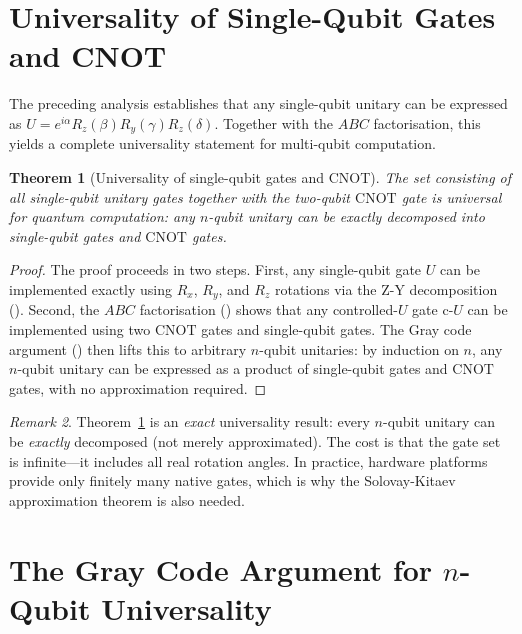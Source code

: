 \documentclass[12pt, a4paper, oneside]{report}
\theoremstyle{plain}
\newtheorem{theorem}{Theorem}[chapter]
\theoremstyle{definition}
\theoremstyle{remark}
\newtheorem{remark}[theorem]{Remark}
\newcommand{\cU}{\mathrm{c}\text{-}U}
\newcommand{\CNOT}{\mathrm{CNOT}}
\newcommand{\Rx}{R_x}
\newcommand{\Ry}{R_y}
\newcommand{\Rz}{R_z}
\begin{document}

\section{Universality of Single-Qubit Gates and CNOT}

The preceding analysis establishes that any single-qubit unitary can be expressed as
$U = e^{i\alpha}\Rz(\beta)\Ry(\gamma)\Rz(\delta)$. Together with the $ABC$ factorisation,
this yields a complete universality statement for multi-qubit computation.

\begin{theorem}[Universality of single-qubit gates and CNOT]
	\label{thm:sq-cnot-univ}
	The set consisting of all single-qubit unitary gates together with the two-qubit $\CNOT$
	gate is universal for quantum computation: any $n$-qubit unitary can be exactly decomposed
	into single-qubit gates and $\CNOT$ gates.
\end{theorem}

\begin{proof}
	The proof proceeds in two steps. First, any single-qubit gate $U$ can be implemented exactly
	using $\Rx$, $\Ry$, and $\Rz$ rotations via the Z-Y decomposition (). Second,
	the $ABC$ factorisation () shows that any controlled-$U$ gate $\cU$ can be
	implemented using two $\CNOT$ gates and single-qubit gates. The Gray code argument
	() then lifts this to arbitrary $n$-qubit unitaries: by induction on
	$n$, any $n$-qubit unitary can be expressed as a product of single-qubit gates and $\CNOT$
	gates, with no approximation required.
\end{proof}

\begin{remark}
	Theorem~\ref{thm:sq-cnot-univ} is an \emph{exact} universality result: every $n$-qubit
	unitary can be \emph{exactly} decomposed (not merely approximated). The cost is that the
	gate set is infinite---it includes all real rotation angles. In practice, hardware platforms
	provide only finitely many native gates, which is why the Solovay-Kitaev approximation
	theorem is also needed.
\end{remark}




\section{The Gray Code Argument for \texorpdfstring{$n$}{n}-Qubit Universality}
\label{sec:graycodearg}
\end{document}
